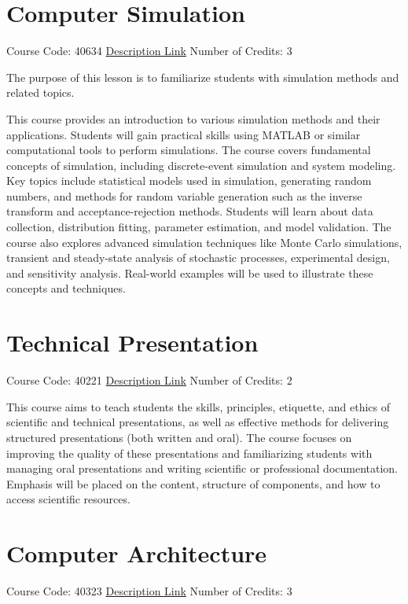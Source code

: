 \documentclass[
fontsize=11pt,
paper=a4,
parskip=half,
enlargefirstpage=off,    %
fromalign=right,        %
fromphone=on,           %
fromemail=on,
fromrule=off,           %
addrfield=off,          %
backaddress=on,         %
subject=beforeopening,  %
locfield=narrow,        %
foldmarks=off,          %
open=any
]{scrartcl}
\begin{document}
\section{Computer Simulation}
Course Code: 40634 \qquad \quad \href{https://docs.ce.sharif.edu/course/40634}{Description Link}
\qquad \quad Number of Credits: 3

The purpose of this lesson is to familiarize students with simulation methods and related topics.

This course provides an introduction to various simulation methods and their applications. Students will gain practical skills using MATLAB or similar computational tools to perform simulations. The course covers fundamental concepts of simulation, including discrete-event simulation and system modeling. Key topics include statistical models used in simulation, generating random numbers, and methods for random variable generation such as the inverse transform and acceptance-rejection methods. Students will learn about data collection, distribution fitting, parameter estimation, and model validation. The course also explores advanced simulation techniques like Monte Carlo simulations, transient and steady-state analysis of stochastic processes, experimental design, and sensitivity analysis. Real-world examples will be used to illustrate these concepts and techniques.


\section{Technical Presentation}
Course Code: 40221 \qquad \quad \href{https://docs.ce.sharif.edu/course/40221}{Description Link}
\qquad \quad Number of Credits: 2

This course aims to teach students the skills, principles, etiquette, and ethics of scientific and technical presentations, as well as effective methods for delivering structured presentations (both written and oral). The course focuses on improving the quality of these presentations and familiarizing students with managing oral presentations and writing scientific or professional documentation. Emphasis will be placed on the content, structure of components, and how to access scientific resources.

\section{Computer Architecture}
Course Code: 40323 \qquad \quad \href{https://docs.ce.sharif.edu/course/40323}{Description Link}
\qquad \quad Number of Credits: 3
\end{document}
